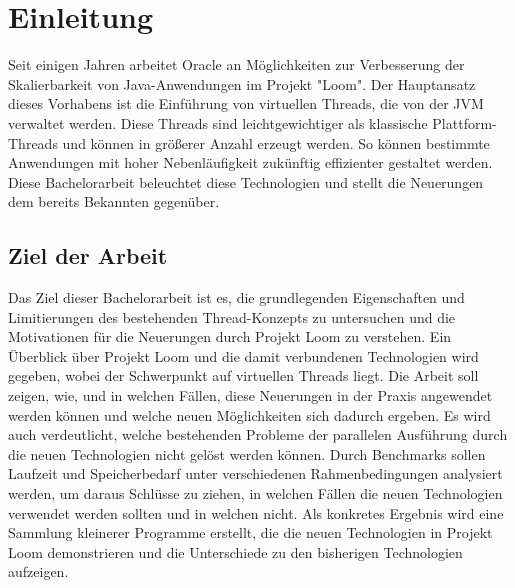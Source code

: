 \chapter{Einleitung}
\label{cha:Einleitung}

    Seit einigen Jahren arbeitet Oracle an Möglichkeiten zur Verbesserung der Skalierbarkeit von Java-Anwendungen im Projekt "Loom".
    Der Hauptansatz dieses Vorhabens ist die Einführung von virtuellen Threads, die von der JVM verwaltet werden. 
    Diese Threads sind leichtgewichtiger als klassische Plattform-Threads und können in größerer Anzahl erzeugt werden.
    So können bestimmte Anwendungen mit hoher Nebenläufigkeit zukünftig effizienter gestaltet werden. Diese Bachelorarbeit 
    beleuchtet diese Technologien und stellt die Neuerungen dem bereits Bekannten gegenüber.

\section{Ziel der Arbeit}
\label{sec:Ziel}

    Das Ziel dieser Bachelorarbeit ist es, die grundlegenden Eigenschaften und Limitierungen des bestehenden Thread-Konzepts zu untersuchen und die Motivationen für die Neuerungen
    durch Projekt Loom zu verstehen. Ein Überblick über Projekt Loom und die damit verbundenen Technologien wird gegeben, wobei der Schwerpunkt auf virtuellen Threads liegt. 
    Die Arbeit soll zeigen, wie, und in welchen Fällen, diese Neuerungen in der Praxis angewendet werden können und welche neuen Möglichkeiten sich dadurch ergeben. 
    Es wird auch verdeutlicht, welche bestehenden Probleme der parallelen Ausführung durch die neuen Technologien nicht gelöst werden können. 
    Durch Benchmarks sollen Laufzeit und Speicherbedarf unter verschiedenen Rahmenbedingungen analysiert werden, um daraus Schlüsse zu ziehen, 
    in welchen Fällen die neuen Technologien verwendet werden sollten und in welchen nicht. Als konkretes Ergebnis wird eine Sammlung kleinerer Programme erstellt, 
    die die neuen Technologien in Projekt Loom demonstrieren und die Unterschiede zu den bisherigen Technologien aufzeigen.



